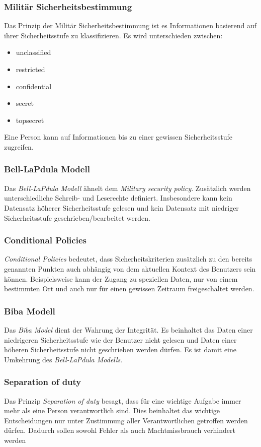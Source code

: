 \subsubsection*{Militär Sicherheitsbestimmung}
Das Prinzip der Militär Sicherheitsbestimmung ist es Informationen basierend auf ihrer Sicherheitsstufe zu klassifizieren. Es wird unterschieden zwischen:
\begin{itemize}
\item unclassified
\item restricted
\item confidential
\item secret 
\item topsecret
\end{itemize}  
Eine Person kann auf Informationen bis zu einer gewissen Sicherheitsstufe zugreifen. 
\subsubsection*{Bell-LaPdula Modell}
Das \textit{Bell-LaPdula Modell} ähnelt dem \textit{Military security policy}. Zusätzlich werden unterschiedliche Schreib- und Leserechte definiert. Insbesondere kann kein Datensatz höherer Sicherheitsstufe gelesen und kein Datensatz mit niedriger Sicherheitsstufe geschrieben/bearbeitet werden.
\subsubsection*{Conditional Policies}
\textit{Conditional Policies} bedeutet, dass Sicherheitskriterien zusätzlich zu den bereits genannten Punkten auch abhängig von dem aktuellen Kontext des Benutzers sein können. Beispielsweise kann der Zugang zu speziellen Daten, nur von einem bestimmten Ort und auch nur für einen gewissen Zeitraum freigeschaltet werden.
\subsubsection*{Biba Modell}
Das \textit{Biba Model} dient der Wahrung der Integrität. Es beinhaltet das Daten einer niedrigeren Sicherheitsstufe wie der Benutzer nicht gelesen und Daten einer höheren Sicherheitsstufe nicht geschrieben werden dürfen. Es ist damit eine Umkehrung des \textit{Bell-LaPdula Modells}.
\subsubsection*{Separation of duty}
Das Prinzip \textit{Separation of duty} besagt, dass für eine wichtige Aufgabe immer mehr als eine Person verantwortlich sind. Dies beinhaltet das wichtige Entscheidungen nur unter Zustimmung aller Verantwortlichen getroffen werden dürfen. Dadurch sollen sowohl Fehler als auch Machtmissbrauch verhindert werden

